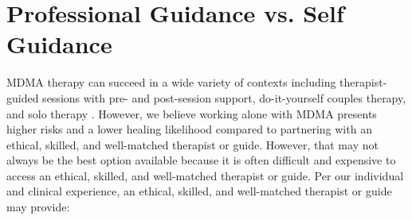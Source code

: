 \documentclass[12pt,letterpaper]{book}
\begin{document}
\section{Professional Guidance vs. Self Guidance}
\label{professionalVSSelf}
MDMA therapy can succeed in a wide variety of contexts including therapist-guided sessions with pre- and post-session support, do-it-yourself couples therapy, and solo therapy \cite{mitchellMDMAClinicalTrial2,colbertEvenings,hillsSolo}. However, we believe working alone with MDMA presents higher risks and a lower healing likelihood compared to partnering with an ethical, skilled, and well-matched therapist or guide. However, that may not always be the best option available because it is often difficult and expensive to access an ethical, skilled, and well-matched therapist or guide. Per our individual and clinical experience, an ethical, skilled, and well-matched therapist or guide may provide:
\end{document}
